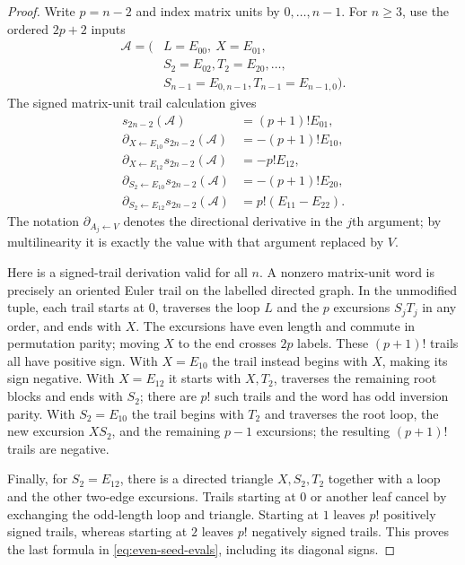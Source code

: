 \begin{proof}
Write $p=n-2$ and index matrix units by $0,\ldots,n-1$.
For $n\ge3$, use the ordered $2p+2$ inputs
\begin{equation}\label{eq:even-tuple}
\begin{aligned}
 \mathcal A=(&L=E_{00},\ X=E_{01},\\[-2pt]
 &S_2=E_{02},T_2=E_{20},\ldots,\\[-2pt]
 &S_{n-1}=E_{0,n-1},T_{n-1}=E_{n-1,0}).
\end{aligned}
\end{equation}
The signed matrix-unit trail calculation gives
\begin{equation}\label{eq:even-seed-evals}
\begin{aligned}
 s_{2n-2}(\mathcal A)&=(p+1)!E_{01},\\
 \partial_{X\gets E_{10}}s_{2n-2}(\mathcal A)&=-(p+1)!E_{10},\\
 \partial_{X\gets E_{12}}s_{2n-2}(\mathcal A)&=-p!E_{12},\\
 \partial_{S_2\gets E_{10}}s_{2n-2}(\mathcal A)&=-(p+1)!E_{20},\\
 \partial_{S_2\gets E_{12}}s_{2n-2}(\mathcal A)&=p!(E_{11}-E_{22}).
\end{aligned}
\end{equation}
The notation $\partial_{A_j\gets V}$ denotes the directional
derivative in the $j$th argument; by multilinearity it is exactly
the value with that argument replaced by $V$.

Here is a signed-trail derivation valid for all $n$. A nonzero
matrix-unit word is precisely an oriented Euler trail on the
labelled directed graph. In the unmodified tuple, each trail starts
at $0$, traverses the loop $L$ and the $p$ excursions
$S_jT_j$ in any order, and ends with $X$. The excursions have
even length and commute in permutation parity; moving $X$ to the
end crosses $2p$ labels. These $(p+1)!$ trails all have positive
sign. With $X=E_{10}$ the trail instead begins with $X$, making
its sign negative. With $X=E_{12}$ it starts with $X,T_2$,
traverses the remaining root blocks and ends with $S_2$;
there are $p!$ such trails and the word has odd inversion parity.
With $S_2=E_{10}$ the trail begins with $T_2$ and traverses the
root loop, the new excursion $XS_2$, and the remaining
$p-1$ excursions; the resulting $(p+1)!$ trails are negative.

Finally, for $S_2=E_{12}$, there is a directed triangle
$X,S_2,T_2$ together with a loop and the other two-edge
excursions. Trails starting at $0$ or another leaf cancel by
exchanging the odd-length loop and triangle. Starting at $1$
leaves $p!$ positively signed trails, whereas starting at $2$
leaves $p!$ negatively signed trails. This proves the last
formula in \eqref{eq:even-seed-evals}, including its diagonal
signs.


\end{proof}
